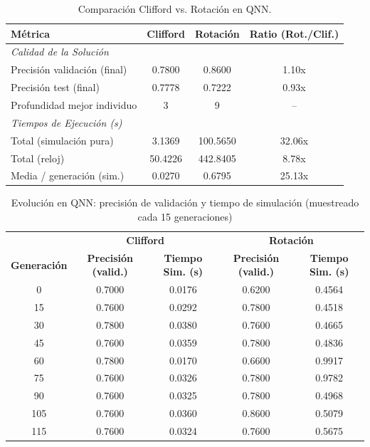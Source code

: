 \begin{table}[htbp]
\centering
\begin{tabular}{lccc}
\toprule
\textbf{Métrica} & \textbf{Clifford} & \textbf{Rotación} & \textbf{Ratio (Rot./Clif.)} \\
\midrule
\multicolumn{4}{l}{\textit{Calidad de la Solución}} \\
\midrule
Precisión validación (final) & 0.7800 & 0.8600 & 1.10x \\
Precisión test (final) & 0.7778 & 0.7222 & 0.93x \\
Profundidad mejor individuo & 3 & 9 & -- \\
\midrule
\multicolumn{4}{l}{\textit{Tiempos de Ejecución (s)}} \\
\midrule
Total (simulación pura) & 3.1369 & 100.5650 & 32.06x \\
Total (reloj) & 50.4226 & 442.8405 & 8.78x \\
Media / generación (sim.) & 0.0270 & 0.6795 & 25.13x \\
\bottomrule
\end{tabular}
\caption{Comparación Clifford vs. Rotación en QNN.}
\label{tab:comparison-qnn}
\end{table}

\begin{table}[htbp]
\centering
\begin{tabular}{c | cc | cc}
\toprule
& \multicolumn{2}{c|}{\textbf{Clifford}} & \multicolumn{2}{c}{\textbf{Rotación}} \\
\textbf{Generación} & \textbf{Precisión (valid.)} & \textbf{Tiempo Sim. (s)} & \textbf{Precisión (valid.)} & \textbf{Tiempo Sim. (s)} \\
\midrule
0 & 0.7000 & 0.0176 & 0.6200 & 0.4564 \\
15 & 0.7600 & 0.0292 & 0.7800 & 0.4518 \\
30 & 0.7800 & 0.0380 & 0.7600 & 0.4665 \\
45 & 0.7600 & 0.0359 & 0.7800 & 0.4836 \\
60 & 0.7800 & 0.0170 & 0.6600 & 0.9917 \\
75 & 0.7600 & 0.0326 & 0.7800 & 0.9782 \\
90 & 0.7600 & 0.0325 & 0.7800 & 0.4968 \\
105 & 0.7600 & 0.0360 & 0.8600 & 0.5079 \\
115 & 0.7600 & 0.0324 & 0.7600 & 0.5675 \\
\bottomrule
\end{tabular}
\caption{Evolución en QNN: precisión de validación y tiempo de simulación (muestreado cada 15 generaciones)}
\label{tab:history-qnn}
\end{table}
